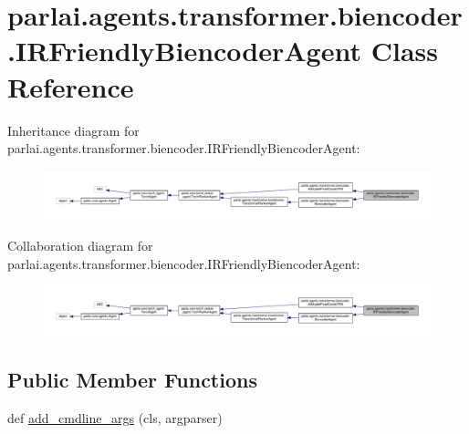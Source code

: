 \hypertarget{classparlai_1_1agents_1_1transformer_1_1biencoder_1_1IRFriendlyBiencoderAgent}{}\section{parlai.\+agents.\+transformer.\+biencoder.\+I\+R\+Friendly\+Biencoder\+Agent Class Reference}
\label{classparlai_1_1agents_1_1transformer_1_1biencoder_1_1IRFriendlyBiencoderAgent}


Inheritance diagram for parlai.\+agents.\+transformer.\+biencoder.\+I\+R\+Friendly\+Biencoder\+Agent\+:\nopagebreak
\begin{figure}[H]
\begin{center}
\leavevmode
\includegraphics[width=350pt]{da/d8d/classparlai_1_1agents_1_1transformer_1_1biencoder_1_1IRFriendlyBiencoderAgent__inherit__graph}
\end{center}
\end{figure}


Collaboration diagram for parlai.\+agents.\+transformer.\+biencoder.\+I\+R\+Friendly\+Biencoder\+Agent\+:
\nopagebreak
\begin{figure}[H]
\begin{center}
\leavevmode
\includegraphics[width=350pt]{d2/dc5/classparlai_1_1agents_1_1transformer_1_1biencoder_1_1IRFriendlyBiencoderAgent__coll__graph}
\end{center}
\end{figure}
\subsection*{Public Member Functions}
\begin{DoxyCompactItemize}
\item 
def \hyperlink{classparlai_1_1agents_1_1transformer_1_1biencoder_1_1IRFriendlyBiencoderAgent_a8ad3444ddd1002990ce5472fa1ec72bf}{add\+\_\+cmdline\+\_\+args} (cls, argparser)
\end{DoxyCompactItemize}
